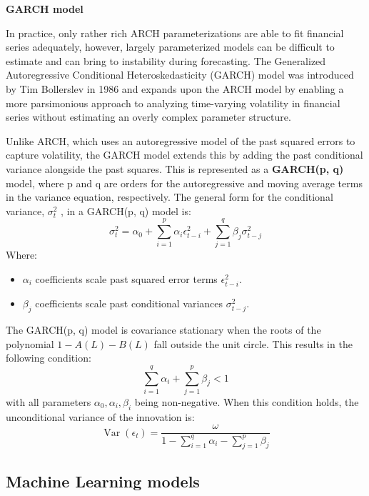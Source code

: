\textbf{GARCH model}

In practice, only rather rich ARCH parameterizations are able to fit financial series adequately, however, largely parameterized models can be difficult to estimate and can bring to instability during forecasting. The Generalized Autoregressive Conditional Heteroskedasticity (GARCH) model was introduced by Tim Bollerslev in 1986 \cite{Bollerslev1986} and expands upon the ARCH model by enabling a more parsimonious approach to analyzing time-varying volatility in financial series without estimating an overly complex parameter structure. 

Unlike ARCH, which uses an autoregressive model of the past squared errors to capture volatility, the GARCH model extends this by adding the past conditional variance alongside the past squares. This is represented as a \textbf{GARCH(p, q)} model, where p and q are orders for the autoregressive and moving average terms in the variance equation, respectively. The general form for the conditional variance, \(\sigma _{t}^{2}\) , in a GARCH(p, q) model is:
\begin{equation}
\sigma_{t}^{2} = \alpha_{0} + \sum_{i=1}^{p} \alpha_{i} \epsilon_{t-i}^{2} + \sum_{j=1}^{q} \beta_{j} \sigma_{t-j}^{2}
\end{equation} 
Where: 
\begin{itemize}
    \item $\alpha_{i}$ coefficients scale past squared error terms $\epsilon_{t-i}^{2}$.
    \item $\beta_{j}$ coefficients scale past conditional variances $\sigma_{t-j}^{2}$.
\end{itemize}

The GARCH(p, q) model is covariance stationary when the roots of the polynomial \(1 - A(L) - B(L)\) fall outside the unit circle. This results in the following condition: 
\begin{equation}
\sum_{i=1}^{q} \alpha_{i} + \sum_{j=1}^{p} \beta_{j} < 1
\end{equation} 
with all parameters \(\alpha_{0}, \alpha_{i}, \beta_{i}\) being non-negative. When this condition holds, the unconditional variance of the innovation is: 
\begin{equation}
\operatorname{Var}(\epsilon_{t}) = \frac{\omega}{1 - \sum_{i=1}^{q} \alpha_{i} - \sum_{j=1}^{p} \beta_{j}}
\end{equation}


\subsection{Machine Learning models} %

